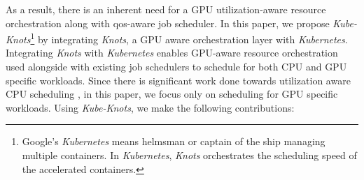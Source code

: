 As a result, there is an inherent need for a GPU utilization-aware resource orchestration along with qos-aware job scheduler. In this paper, we propose \textit{Kube-Knots}\footnote{Google's \textit{Kubernetes} means helmsman or captain of the ship managing multiple containers. In \textit{Kubernetes},  \textit{Knots} orchestrates the scheduling speed of the accelerated containers.} by integrating \textit{Knots}, a GPU aware orchestration layer with \textit{Kubernetes}. Integrating \textit{Knots} with \textit{Kubernetes} enables GPU-aware resource orchestration used alongside with existing job schedulers to schedule for both CPU and GPU specific workloads. Since there is significant work done towards utilization aware CPU scheduling  \cite{Tang:2013:RRS:2451116.2451126,Marsbubbleup,Yang:bubbleflux}, in this paper, we focus only on scheduling for GPU specific workloads. Using \textit{Kube-Knots}, we make the following contributions:
\\
